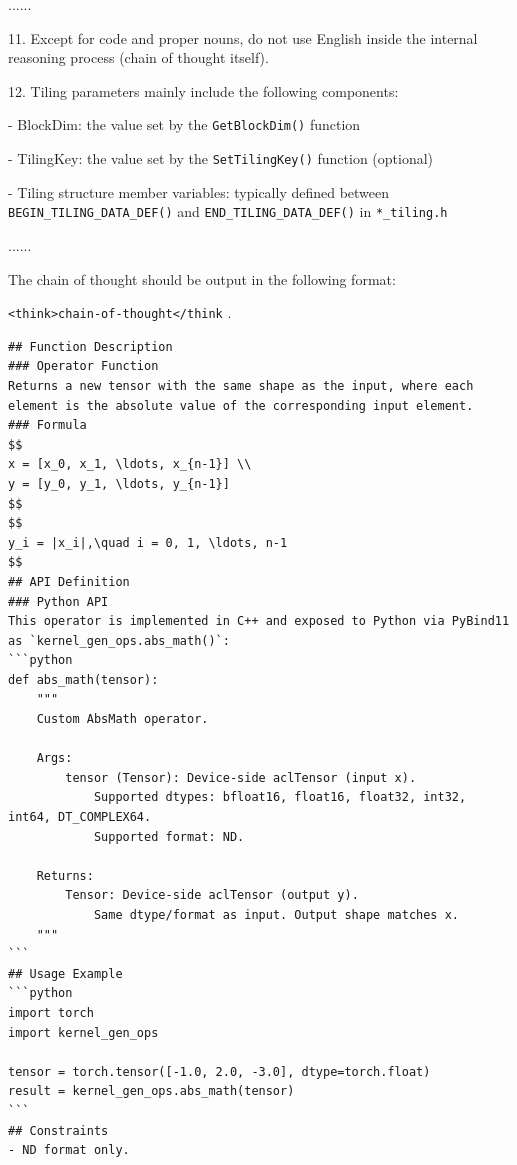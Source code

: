 \begin{tcolorbox}
\begin{tcolorbox}
{......

11. Except for code and proper nouns, do not use English inside the internal reasoning process (chain of thought itself).

12. Tiling parameters mainly include the following components:

    - {BlockDim}: the value set by the \texttt{GetBlockDim()} function
    
    - {TilingKey}: the value set by the \texttt{SetTilingKey()} function (optional)
    
    - {Tiling structure member variables}: typically defined between
      \texttt{BEGIN\_TILING\_DATA\_DEF()} and \texttt{END\_TILING\_DATA\_DEF()} in \texttt{*\_tiling.h}
    
......


The chain of thought should be output in the following format:

\texttt{<think>chain-of-thought</think}
.}
\end{tcolorbox}

\begin{tcolorbox}[
      sharp corners,
      colframe=taskblue,
      colback=taskblue!5,
      colbacktitle=taskblue!15,
      coltitle=taskblue,
      boxrule=0.4pt,
      title={\textbf{Test cases}},
      fonttitle=\bfseries\small,
      left=0pt,
      right=0pt,
      top=0pt,
      bottom=0pt
    ]
\begin{lstlisting}[style=mdstyle]
## Function Description
### Operator Function
Returns a new tensor with the same shape as the input, where each element is the absolute value of the corresponding input element.
### Formula
$$
x = [x_0, x_1, \ldots, x_{n-1}] \\
y = [y_0, y_1, \ldots, y_{n-1}]
$$
$$
y_i = |x_i|,\quad i = 0, 1, \ldots, n-1
$$
## API Definition
### Python API
This operator is implemented in C++ and exposed to Python via PyBind11 as `kernel_gen_ops.abs_math()`:
```python
def abs_math(tensor):
    """
    Custom AbsMath operator.

    Args:
        tensor (Tensor): Device-side aclTensor (input x).
            Supported dtypes: bfloat16, float16, float32, int32, int64, DT_COMPLEX64.
            Supported format: ND.

    Returns:
        Tensor: Device-side aclTensor (output y).
            Same dtype/format as input. Output shape matches x.
    """
```
## Usage Example
```python
import torch
import kernel_gen_ops

tensor = torch.tensor([-1.0, 2.0, -3.0], dtype=torch.float)
result = kernel_gen_ops.abs_math(tensor)
```
## Constraints
- ND format only.
\end{lstlisting}
 \end{tcolorbox}
 

\end{tcolorbox}
